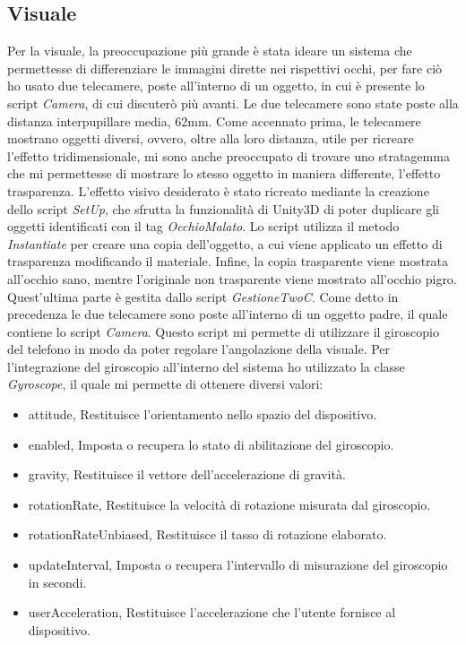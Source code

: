 \documentclass[
a4paper,
cleardoublepage=empty,
headings=twolinechapter,
numbers=autoenddot,
]{scrbook}
\begin{document}
     \subsection{Visuale}
     Per la visuale, la preoccupazione più grande è stata ideare un sistema che permettesse di differenziare le immagini dirette nei rispettivi occhi, per fare ciò ho usato due telecamere, poste all'interno di un oggetto, in cui è presente lo script \textit{Camera}, di cui discuterò più avanti.
     Le due telecamere sono state poste alla distanza interpupillare media, 62mm\cite{Distanza_occhi}.
     Come accennato prima, le telecamere mostrano oggetti diversi, ovvero, oltre alla loro distanza, utile per ricreare l'effetto tridimensionale, mi sono anche preoccupato di trovare uno stratagemma che mi permettesse di mostrare lo stesso oggetto in maniera differente, l'effetto trasparenza.
     L'effetto visivo desiderato è stato ricreato mediante la creazione dello script \textit{SetUp}, che sfrutta la funzionalità di Unity3D di poter duplicare gli oggetti identificati con il tag \textit{OcchioMalato}. Lo script utilizza il metodo \textit{Instantiate} per creare una copia dell'oggetto, a cui viene applicato un effetto di trasparenza modificando il materiale. Infine, la copia trasparente viene mostrata all'occhio sano, mentre l'originale non trasparente viene mostrato all'occhio pigro. Quest'ultima parte è gestita dallo script \textit{GestioneTwoC}.
     Come detto in precedenza le due telecamere sono poste all'interno di un oggetto padre, il quale contiene lo script \textit{Camera}.
     Questo script mi permette di utilizzare il giroscopio del telefono in modo da poter regolare l'angolazione della visuale.
     Per l'integrazione del giroscopio all'interno del sistema ho utilizzato la classe \textit{Gyroscope}, il quale mi permette di ottenere diversi valori:
     \begin{itemize}
        \item attitude,	Restituisce l'orientamento nello spazio del dispositivo.
        \item enabled, Imposta o recupera lo stato di abilitazione del giroscopio.
        \item gravity, Restituisce il vettore dell'accelerazione di gravità.
        \item rotationRate,	Restituisce la velocità di rotazione misurata dal giroscopio.
        \item rotationRateUnbiased,	Restituisce il tasso di rotazione elaborato.
        \item updateInterval, Imposta o recupera l'intervallo di misurazione del giroscopio in secondi.
        \item userAcceleration,	Restituisce l'accelerazione che l'utente fornisce al dispositivo.
     \end{itemize}
\end{document}
